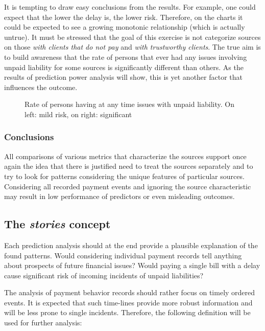 \documentclass{article}
\begin{document}
\par
It is tempting to draw easy conclusions from the results.
For example, one could expect that the lower the delay is, the lower risk.
Therefore, on the charts it could be expected to see a growing monotonic relationship (which is actually untrue).
It must be stressed that the goal of this exercise is not categorize sources on those \textit{with clients that do not pay} and \textit{with trustworthy clients}.
The true aim is to build awareness that the rate of persons that ever had any issues involving unpaid liability for some sources is significantly different than others.
As the results of prediction power analysis will show, this is yet another factor that influences the outcome.

\begin{figure}[htbp!]
    \begin{center}
        
    \caption{Rate of persons having at any time issues with unpaid liability. On left: mild risk, on right: significant}
    \label{fig:102_risk_rate}
    \end{center}
\end{figure}

\subsubsection{Conclusions}

All comparisons of various metrics that characterize the sources support once again the idea that there is justified
need to treat the sources separately and to try to look for patterns considering the unique features of particular sources.
Considering all recorded payment events and ignoring the source characteristic may result in low performance of
predictors \- or even misleading outcomes.

\subsection{The \textit{stories} concept}
\label{section:exploratory-stories}

Each prediction analysis should at the end provide a plausible explanation of the found patterns.
Would considering individual payment records tell anything about prospects of future financial issues?
Would paying a single bill with a delay cause significant risk of incoming incidents of unpaid liabilities?
\par
The analysis of payment behavior records should rather focus on timely ordered events.
It is expected that such time-lines provide more robust information and will be less prone to single incidents.
Therefore, the following definition will be used for further analysis:
\end{document}
